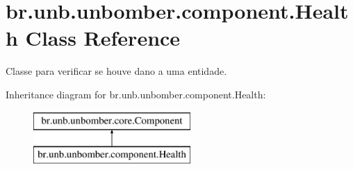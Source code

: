 \hypertarget{classbr_1_1unb_1_1unbomber_1_1component_1_1_health}{\section{br.\+unb.\+unbomber.\+component.\+Health Class Reference}
\label{classbr_1_1unb_1_1unbomber_1_1component_1_1_health}
}


Classe para verificar se houve dano a uma entidade.  


Inheritance diagram for br.\+unb.\+unbomber.\+component.\+Health\+:\begin{figure}[H]
\begin{center}
\leavevmode
\includegraphics[height=2.000000cm]{classbr_1_1unb_1_1unbomber_1_1component_1_1_health}
\end{center}
\end{figure}
